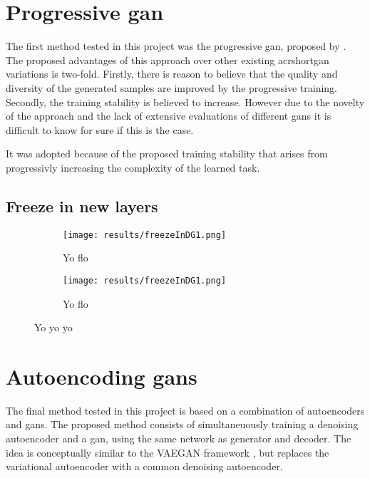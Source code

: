 \section{Progressive \acrshort{gan}}
The first method tested in this project was the progressive \acrshort{gan}, proposed by \textcite{karras2017progressive}. The proposed advantages of this approach over other existing acrshort{gan} variations is two-fold. Firstly, there is reason to believe that the quality and diversity of the generated samples are improved by the progressive training. Secondly, the training stability is believed to increase. However due to the novelty of the approach and the lack of extensive evaluations of different \acrshort{gans} it is difficult to know for sure if this is the case.

It was adopted because of the proposed training stability that arises from progressivly increasing the complexity of the learned task. 

\subsection{Freeze in new layers}

\begin{figure}[t]
    \centering
    \begin{subfigure}[b]{0.45\textwidth}
        \texttt{[image: results/freezeInDG1.png]}
        \caption{Yo flo}
        \label{fig:freezeInDG1}
    \end{subfigure}
    \begin{subfigure}[b]{0.45\textwidth}
        \texttt{[image: results/freezeInDG1.png]}
        \caption{Yo flo}
        \label{fig:freezeInDG2}
    \end{subfigure}
    \caption{Yo yo yo}
    \label{fig:fadeVsFreeze}
\end{figure}


\section{Autoencoding \acrshort{gans}}
The final method tested in this project is based on a combination of autoencoders and \acrshort{gans}. The proposed method consists of simultaneuously training a denoising autoencoder and a \acrshort{gan}, using the same network as generator and decoder. The idea is conceptually similar to the VAEGAN framework \parencite{LarsenSW15autoencodingbeyond}, but replaces the variational autoencoder with a common denoising autoencoder.



